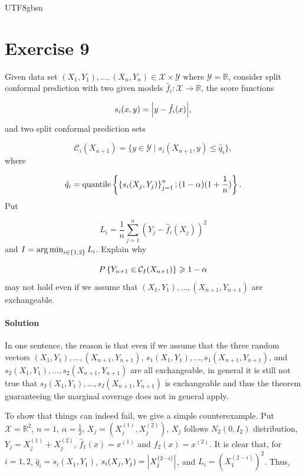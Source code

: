 \documentclass[../main.tex]{subfiles}
\begin{document}
\begin{CJK*}{UTF8}{gbsn}

\section*{Exercise 9}
Given data set $(X_1,Y_1),\ldots,(X_n,Y_n) \in \mathcal{X} \times \mathcal{Y}$
where $\mathcal{Y} = \mathbb{R}$,
consider split conformal prediction with 
two given models $\hat{f}_i: \mathcal{X} \to \mathbb{R}$, 
the score functions

\begin{equation*}
  s_i(x,y) = \abs{y - \hat{f}_i(x)},
\end{equation*}
and two split conformal prediction sets 

\begin{equation*}
\mathcal{C}_i(X_{n+1}) = \{y \in \mathcal{Y} \mid s_i(X_{n+1},y) \leqslant \hat{q}_i\},
\end{equation*}
where 

\begin{equation*}
    \hat{q}_i = \text{quantile}\left \{  \left \{ s_i(X_j,Y_j) \right \}_{j=1}^n ; (1-\alpha)(1+\frac{1}{n}) \right \}.
\end{equation*}
Put 

\begin{equation*}
    L_i = \frac{1}{n} \sum_{j=1}^n (Y_j-\hat{f}_i(X_j))^2
\end{equation*}
and $I = \operatorname*{arg\,min}_{i \in \{1,2\}} L_i$.
Explain why 

\begin{equation*}
    P \left \{ Y_{n+1} \in \mathcal{C}_I(X_{n+1}) \right \} \geqslant 1-\alpha
\end{equation*}
may not hold even if we assume that 
$(X_1,Y_1),\ldots,(X_{n+1},Y_{n+1})$
are exchangeable.

\paragraph{Solution}
In one sentence, the reason is that
even if we assume that the three random vectors 
$(X_1,Y_1),\ldots,(X_{n+1},Y_{n+1})$,
$s_1(X_1,Y_1) ,\ldots,s_1(X_{n+1},Y_{n+1})$,
and $s_2(X_1,Y_1) ,\ldots,s_2(X_{n+1},Y_{n+1})$
are all exchangeable, in general 
it is still not true that 
$s_I(X_1,Y_1) ,\ldots,s_I(X_{n+1},Y_{n+1})$
is exchangeable and thus 
the theorem guaranteeing the marginal coverage does not in general apply.

To show that things can indeed fail,
we give a simple counterexample.
Put $\mathcal{X} = \mathbb{R}^2$, $n = 1$, $\alpha = \frac{1}{2}$,
$X_j = (X_j^{(1)},X_j^{(2)})$, $X_j$ follows $N_2(0,I_2)$
distribution, $Y_j = X_j^{(1)} + X_j^{(2)}$,
$\hat{f}_1(x) = x^{(1)}$ and $\hat{f}_2(x) = x^{(2)}$.
It is clear that, for $i = 1,2$, $\hat{q}_i = s_i(X_1,Y_1)$,
$s_i(X_j, Y_j) = \abs{X_j^{(2-i)}}$,
and $L_i = (X_1^{(2-i)})^2$.
Thus,


\end{CJK*}
\end{document}
